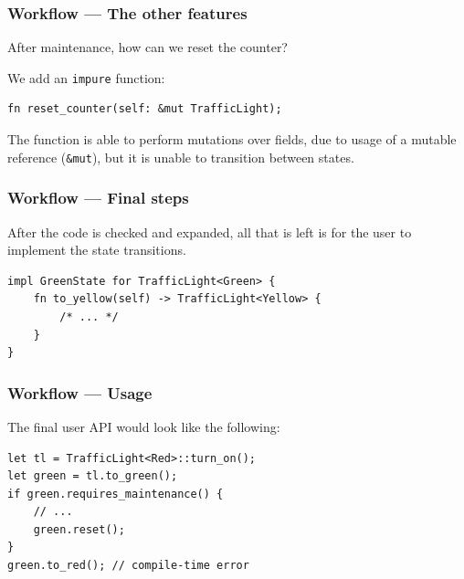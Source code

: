 \documentclass[bigger,notes,aspectratio=169]{beamer}
\begin{document}
\begin{frame}[fragile]
    \frametitle{Workflow --- The other features}
    After maintenance, how can we reset the counter?

    We add an \texttt{impure} function:
    \begin{listing}
        \centering
        \begin{verbatim}
fn reset_counter(self: &mut TrafficLight);
        \end{verbatim}
    \end{listing}
    The function is able to perform mutations over fields, due to usage of a mutable reference (\texttt{\&mut}),
    but it is unable to transition between states.

\end{frame}

\begin{frame}[fragile]
    \frametitle{Workflow --- Final steps}
    After the code is checked and expanded, all that is left is for the user to implement the state transitions.
    \begin{listing}
        \centering
        \begin{verbatim}
impl GreenState for TrafficLight<Green> {
    fn to_yellow(self) -> TrafficLight<Yellow> {
        /* ... */
    }
}
        \end{verbatim}
    \end{listing}

\end{frame}

\begin{frame}[fragile]
    \frametitle{Workflow --- Usage}
    The final user API would look like the following:
    \begin{listing}
        \centering
        \begin{verbatim}
let tl = TrafficLight<Red>::turn_on();
let green = tl.to_green();
if green.requires_maintenance() {
    // ...
    green.reset();
}
green.to_red(); // compile-time error
        \end{verbatim}
    \end{listing}

\end{frame}
\end{document}
